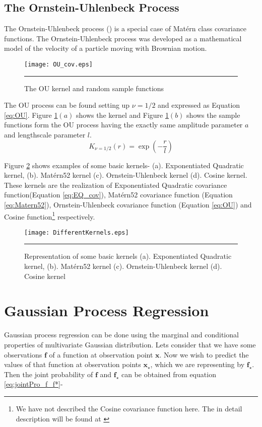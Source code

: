 \subsection{The Ornstein-Uhlenbeck Process}
The Ornstein-Uhlenbeck process (\cite{Ornstein_Uhlenbeck:1930}) is a special case of 
Mat{\'e}rn class covariance functions. The Ornstein-Uhlenbeck process was 
developed as a mathematical model of the velocity of a particle moving with Brownian motion.
\begin{figure}[t]
	\centering
		\texttt{[image: OU\_cov.eps]}
		\rule{35em}{0.5pt}
	\caption[The OU kernel and random sample functions]
		{The OU kernel and random sample functions}
	\label{fig:OU_covariance}
\end{figure}
The OU process can be found setting up $\nu=1/2$ and expressed as Equation \ref{eq:OU}.
Figure \ref{fig:OU_covariance}$(a)$ shows the kernel and
Figure \ref{fig:OU_covariance}$(b)$ shows the sample functions form the OU process having the 
exactly same amplitude parameter $a$ and lengthscale parameter $l$.  
\begin{equation} \label{eq:OU}
K_{\nu=1/2}(r)=	\exp \left(-\frac{r}{l} \right)
\end{equation}

Figure \ref{fig:DifferentKernels} shows examples of some basic kernels- (a). Exponentiated Quadratic kernel, 
(b). Mat{\'e}rn52 kernel (c). Ornstein-Uhlenbeck kernel (d). Cosine kernel. These kernels are the 
realization of Exponentiated Quadratic covariance function(Equation \ref{eq:EQ_cov}), 
Mat{\'e}rn52 covariance function 
(Equation \ref{eq:Matern52}), Ornstein-Uhlenbeck covariance function (Equation \ref{eq:OU}) 
and Cosine function\footnote{We have not described the Cosine covariance function here. 
The in detail description will be found at \cite{Rasmussen_and_Williams:2006}} respectively.

\begin{figure}[t]
	\centering
		\texttt{[image: DifferentKernels.eps]}
		\rule{35em}{0.5pt}
	\caption[Representation of some basic kernels ]
		{Representation of some basic kernels (a). Exponentiated Quadratic kernel, 
		(b). Mat{\'e}rn52 kernel (c). Ornstein-Uhlenbeck kernel (d). Cosine kernel  }
	\label{fig:DifferentKernels}
\end{figure}

\section{Gaussian Process Regression}
Gaussian process regression can be done using the marginal and conditional properties of multivariate
Gaussian distribution. Lets consider that we have some observations $\mathbf{f}$ of a function at observation
point $\mathbf{x}$. Now we wish to predict the values of that function at observation points $\mathbf{x_\star}$,
which we are representing by $\mathbf{f_\star}$. Then the joint probability of $\mathbf{f}$ and $\mathbf{f_\star}$
can be obtained from equation \ref{eq:jointPro_f_f*}-

